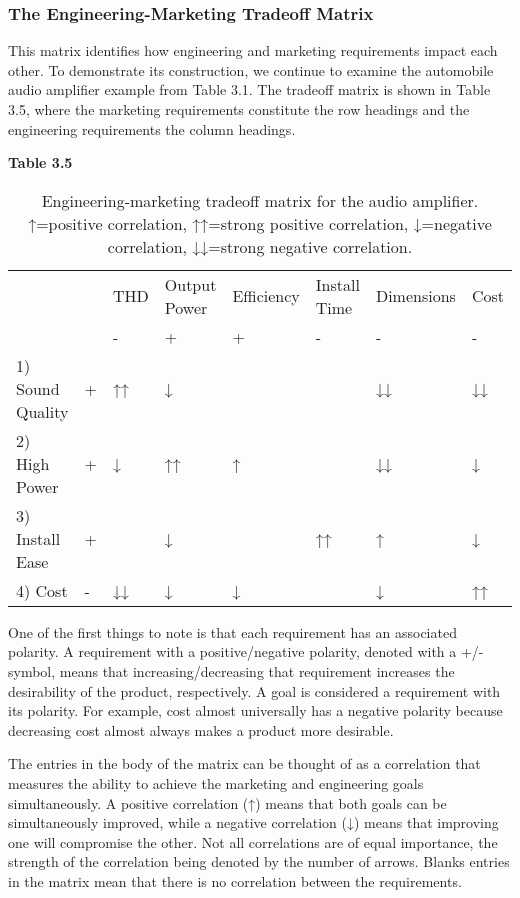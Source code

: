 \subsubsection{The Engineering-Marketing Tradeoff
Matrix}\label{the-engineering-marketing-tradeoff-matrix}

This matrix identifies how engineering and marketing requirements impact
each other. To demonstrate its construction, we continue to examine the
automobile audio amplifier example from Table 3.1. The tradeoff matrix
is shown in Table 3.5, where the marketing requirements constitute the
row headings and the engineering requirements the column headings.

\textbf{Table 3.5} 

\begin{table}
\centering
\caption{Engineering-marketing tradeoff matrix for the audio
amplifier. ↑=positive correlation, ↑↑=strong positive correlation,
↓=negative correlation, ↓↓=strong negative correlation.}
\label{table:engMarketingMatrix}

\begin{tabular}{ |l|l|l|l|l|l|l|l|} 
\hline
\rowcolor{Gray}
  &   & THD & Output Power & Efficiency & Install Time & Dimensions & Cost \\ 
  &   &  -      &  +                     & +               & -                   & -                    &  - \\

1) Sound Quality & + & ↑↑ & ↓ & & & ↓↓ & ↓↓ \\
2) High Power & + & ↓ & ↑↑ & ↑ & & ↓↓ & ↓ \\
3) Install Ease & + & & ↓ & & ↑↑ & ↑ & ↓ \\
4) Cost & - & ↓↓ & ↓ & ↓ & & ↓ & ↑↑ \\
\end{tabular}
\end{table}

One of the first things to note is that each requirement has an
associated polarity. A requirement with a positive/negative polarity,
denoted with a +/- symbol, means that increasing/decreasing that
requirement increases the desirability of the product, respectively. A
goal is considered a requirement with its polarity. For example, cost
almost universally has a negative polarity because decreasing cost
almost always makes a product more desirable.

The entries in the body of the matrix can be thought of as a correlation
that measures the ability to achieve the marketing and engineering goals
simultaneously. A positive correlation (↑) means that both goals can be
simultaneously improved, while a negative correlation (↓) means that
improving one will compromise the other. Not all correlations are of
equal importance, the strength of the correlation being denoted by the
number of arrows. Blanks entries in the matrix mean that there is no
correlation between the requirements.

